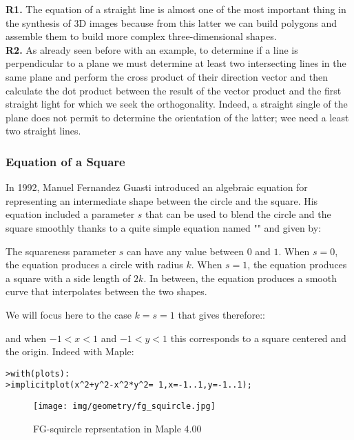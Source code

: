 	\begin{tcolorbox}[title=Remarks,colframe=black,arc=10pt]
	\textbf{R1.} The equation of a straight line is almost one of the most important thing in the synthesis of 3D images because from this latter we can build polygons and assemble them to build more complex three-dimensional shapes.\\
	
	\textbf{R2.} As already seen before with an example, to determine if a line is perpendicular to a plane we must determine at least two intersecting lines in the same plane and perform the cross product of their direction vector and then calculate the dot product between the result of the vector product and the first straight light for which we seek the orthogonality. Indeed, a straight single of the plane does not permit to determine the orientation of the latter; wee need a least two straight lines.
	\end{tcolorbox}
	
	\subsubsection{Equation of a Square}
	In 1992, Manuel Fernandez Guasti introduced an algebraic equation for representing an intermediate shape between the circle and the square. His equation included a parameter $s$ that can be used to blend the circle and the square smoothly thanks to a quite simple equation named "" and given by:
	
	The squareness parameter $s$ can have any value between $0$ and $1$. When $s = 0$, the equation produces a circle with radius $k$. When $s = 1$, the equation produces a square with a side length of $2k$. In between, the equation produces a smooth curve that interpolates between the two shapes.
	
	We will focus here to the case $k=s=1$ that gives therefore::
	
	and when $-1<x<1$ and $-1<y<1$ this corresponds to a square centered and the origin. Indeed with Maple:
	
	\texttt{>with(plots):\\
	>implicitplot(x\string^2+y\string^2-x\string^2*y\string^2= 1,x=-1..1,y=-1..1);
	}
	\begin{figure}[H]
		\centering
		\texttt{[image: img/geometry/fg\_squircle.jpg]}
		\caption{FG-squircle reprsentation in Maple 4.00}
	\end{figure}

